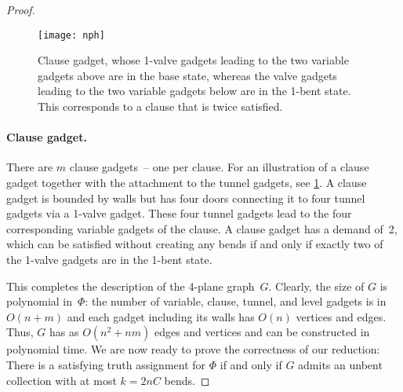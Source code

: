 \documentclass[runningheads]{llncs}
\begin{document}
\begin{proof}
    \begin{figure}[t]
        \centering
        \texttt{[image: nph]}
        \caption{Clause gadget, whose 1-valve gadgets leading to the
            two variable gadgets above are in the base state,
            whereas the valve gadgets leading to the two
            variable gadgets below are in the 1-bent state.
            This corresponds to a clause that is twice satisfied.} %
        \label{fig:nph-clause}
    \end{figure}
    
    \paragraph{Clause gadget.}
    There are $m$ clause gadgets~-- one per clause.
    For an illustration of a clause gadget together
    with the attachment to the tunnel gadgets, see
    \cref{fig:nph-clause}.
    A clause gadget is bounded by walls
    but has four doors connecting it to four
    tunnel gadgets via a 1-valve gadget.
    These four tunnel gadgets lead to the four
    corresponding variable gadgets of the clause.
    A clause gadget has a demand of~2,
    which can be satisfied without creating any
    bends if and only if exactly two of the 1-valve gadgets
    are in the 1-bent state.
    
    This completes the description of the 4-plane graph~$G$.
    Clearly, the size of $G$ is polynomial in~$\Phi$:
    the number of variable, clause, tunnel, and level gadgets
    is in $O(n + m)$ and each gadget including its walls
    has $O(n)$ vertices and edges.
    Thus, $G$ has as $O(n^2 + nm)$ edges and vertices
    and can be constructed in polynomial time.
    We are now ready to prove the correctness of our reduction:
    There is a satisfying truth assignment for $\Phi$
    if and only if $G$ admits an unbent collection
    with at most $k = 2 n C$ bends.
    

\end{proof}
\end{document}

